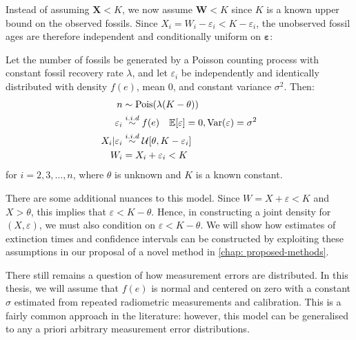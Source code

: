 Instead of assuming $\bm{X} < K$, we now assume $\bm{W} < K$ since $K$ is a known upper bound on the observed fossils. Since $X_i = W_i - \varepsilon_i < K - \varepsilon_i$, the unobserved fossil ages are therefore independent and conditionally uniform on $\bm{\varepsilon}$:
\begin{model}\label{model: measurement-error}
    Let the number of fossils be generated by a Poisson counting process with constant fossil recovery rate $\lambda$, and let $\varepsilon_i$ be independently and identically distributed with density $f(e)$, mean 0, and constant variance $\sigma^2$. Then:
    \begin{align*}
        n &\sim \textrm{Pois}(\lambda(K-\theta)) \\
        \varepsilon_i &\overset{i.i.d}{\sim} f(e) \quad \mathbb{E}[\varepsilon] = 0, \mathrm{Var}(\varepsilon) = \sigma^2 \\
        X_i | \varepsilon_i &\overset{i.i.d}{\sim} \mathcal{U}[\theta, K-\varepsilon_i] \\
        W_i &= X_i + \varepsilon_i < K
    \end{align*}
    for $i = 2, 3, \dots, n$, where $\theta$ is unknown and $K$ is a known constant.
\end{model}
There are some additional nuances to this model. Since $W = X + \varepsilon < K$ and $X > \theta$, this implies that $\varepsilon < K - \theta$. Hence, in constructing a joint density for $(X, \varepsilon)$, we must also condition on $\varepsilon < K - \theta$. We will show how estimates of extinction times and confidence intervals can be constructed by exploiting these assumptions in our proposal of a novel method in \autoref{chap: proposed-methods}.

There still remains a question of how measurement errors are distributed. In this thesis, we will assume that $f(e)$ is normal and centered on zero with a constant $\sigma$ estimated from repeated radiometric  measurements and calibration. This is a fairly common approach in the literature: however, this model can be generalised to any a priori arbitrary measurement error distributions.

